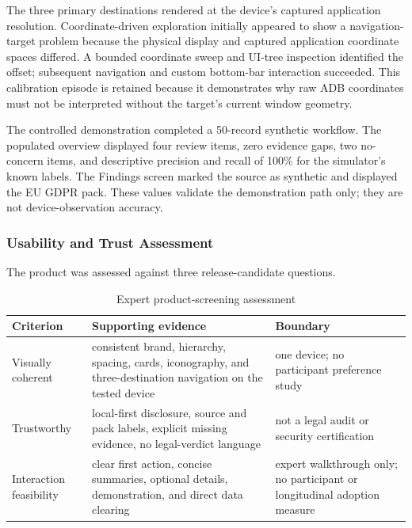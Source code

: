 The three primary destinations rendered at the device's captured application resolution. Coordinate-driven exploration initially appeared to show a navigation-target problem because the physical display and captured application coordinate spaces differed. A bounded coordinate sweep and UI-tree inspection identified the offset; subsequent navigation and custom bottom-bar interaction succeeded. This calibration episode is retained because it demonstrates why raw ADB coordinates must not be interpreted without the target's current window geometry.

The controlled demonstration completed a 50-record synthetic workflow. The populated overview displayed four review items, zero evidence gaps, two no-concern items, and descriptive precision and recall of 100\% for the simulator's known labels. The Findings screen marked the source as synthetic and displayed the EU GDPR pack. These values validate the demonstration path only; they are not device-observation accuracy.

\subsubsection{Usability and Trust Assessment}

The product was assessed against three release-candidate questions.

\begin{table}[H]
\centering
\small
\caption{Expert product-screening assessment}
\begin{tabular}{>{\raggedright\arraybackslash}p{}>{\raggedright\arraybackslash}p{}>{\raggedright\arraybackslash}p{}}
\toprule
Criterion & Supporting evidence & Boundary \\
\midrule
Visually coherent & consistent brand, hierarchy, spacing, cards, iconography, and three-destination navigation on the tested device & one device; no participant preference study \\
Trustworthy & local-first disclosure, source and pack labels, explicit missing evidence, no legal-verdict language & not a legal audit or security certification \\
Interaction feasibility & clear first action, concise summaries, optional details, demonstration, and direct data clearing & expert walkthrough only; no participant or longitudinal adoption measure \\
\bottomrule
\end{tabular}
\end{table}

